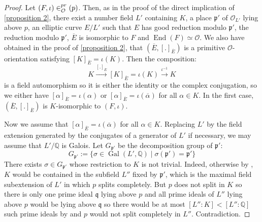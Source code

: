 \documentclass[a4paper,10pt]{report}
\theoremstyle{definition}
\theoremstyle{plain}
\theoremstyle{definition}
\newcommand{\Q}{\mathbb{Q}}
\newcommand{\mO}{\mathcal{O}}
\renewcommand{\(}{\left(}
\renewcommand{\)}{\right)}
\newcommand{\mfp}{\mathfrak{p}}
\newcommand{\mfq}{\mathfrak{q}}
\DeclareMathOperator{\End}{End}
\let\SS\relax
\DeclareMathOperator{\SS}{SS}
\DeclareMathOperator{\Gal}{Gal}
\begin{document}
\begin{proof}
Let $(F,\iota)\in\SS_\mO^{pr}(p)$.  Then, as in the proof of the direct implication of \ref{proposition 2}, there exist a number field $L'$ containing $K$, a place $\mfp'$ of $\mO_{L'}$ lying above $p$, an elliptic curve $E/L'$ such that $E$ has good reduction modulo $\mfp'$, the reduction modulo $\mfp'$,  $\overline{E}$ is isomorphic to $F$ and $\End(F)\simeq \mO$.  We also have obtained in the proof of \ref{proposition 2}, that $(\overline{E},[.]_{\overline{E}})$ is a primitive $\mO$-orientation satisfying $[K]_{\overline{E}}=\iota(K)$. Then the composition:
\[K\overset{[.]_{\overline{E}}}{\longrightarrow}[K]_{\overline{E}}=\iota(K)\overset{\iota^{-1}}{\longrightarrow}K\]
is a field automorphism so it is either the identity or the complex conjugation, so we either have $[\alpha]_{\overline{E}}=\iota(\alpha)$ or $[\alpha]_{\overline{E}}=\iota(\overline{\alpha})$ for all $\alpha\in K$. In the first case, $(\overline{E},[.]_{\overline{E}})$ is $K$-isomorphic to $(F,\iota)$. 

Now we assume that $[\alpha]_{\overline{E}}=\iota(\overline{\alpha})$ for all $\alpha\in K$.  Replacing $L'$ by the field extension generated by the conjugates of a generator of $L'$ if necessary, we may assume that $L'/\Q$ is Galois.  Let $G_{\mfp'}$ be the decomposition group of $\mfp'$:
\[G_{\mfp'}:=\{\sigma\in\Gal(L',\Q)\mid \sigma(\mfp')=\mfp'\}\]
There exists $\sigma\in G_{\mfp'}$ whose restriction to $K$ is not trivial.  Indeed, otherwise by \cite[corollary I.3]{Lang_ANT}, $K$ would be contained in the subfield $L''$ fixed by $\mfp'$, which is the maximal field subextension of $L'$ in which $p$ splits completely.  But $p$ does not split in $K$ so there is only one prime ideal $\mfq$ lying above $p$ and all prime ideals of $L''$ lying above $p$ would be lying above $\mfq$ so there would be at most $[L'':K]<[L'':\Q]$ such prime ideals by \cite[chapter I, proposition 11]{Lang_ANT} and $p$ would not split completely in $L''$.  Contradiction.


\end{proof}
\end{document}
